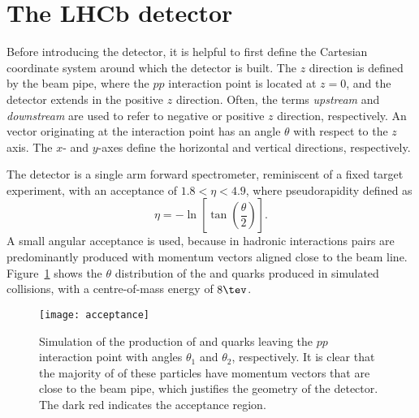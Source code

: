 \section{The LHCb detector}

Before introducing the \lhcb detector, it is helpful to first define the Cartesian coordinate
system around which the \lhcb detector is built.
The $z$ direction is defined by the \lhc beam pipe, where the $pp$ interaction point is located
at $z=0$, and the \lhcb detector extends in the positive $z$ direction.
Often, the terms \emph{upstream} and \emph{downstream} are used to refer to
negative or positive $z$ direction, respectively.
An vector originating at the interaction point has an angle $\theta$ with respect to the $z$ axis.
The $x$- and $y$-axes define the horizontal and vertical directions, respectively.

The \lhcb detector is a single arm forward spectrometer, reminiscent of a fixed target experiment,
with an acceptance of $1.8<\eta<4.9$, where pseudorapidity defined as
\begin{equation}
  \eta = -\ln\left[\tan\left(\frac\theta2\right)\right].
\end{equation}
A small angular acceptance is used, because
in hadronic interactions \bbbar pairs are predominantly
produced with momentum vectors aligned close to the beam line.
Figure~\ref{fig:lhcb:bbbar} shows the $\theta$ distribution of the \bquark and \bquarkbar quarks
produced in simulated \lhc collisions, with a centre-of-mass energy of $8\tev$.

\begin{figure}
  \begin{center}
    \texttt{[image: acceptance]}
  \end{center}
  \caption[Simulated production of $b\bquarkbar$ pairs and the LHCb acceptance]
  {
    Simulation of the production of \bquark and \protect\bquarkbar quarks leaving the $pp$
    interaction point with angles $\theta_1$ and $\theta_2$, respectively.
    It is clear that the majority of of these particles have momentum vectors that are close to the
    beam pipe, which justifies the geometry of the \lhcb detector.
    The dark red indicates the \lhcb acceptance region.
  }
  \label{fig:lhcb:bbbar}
\end{figure}



